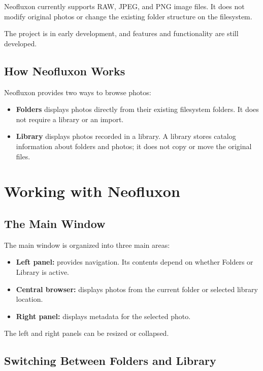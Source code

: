 \documentclass[11pt]{article}
\begin{document}
Neofluxon currently supports RAW, JPEG, and PNG image files. It does not
modify original photos or change the existing folder structure on the
filesystem.

The project is in early development, and features and functionality
are still developed.

\subsection{How Neofluxon Works}

Neofluxon provides two ways to browse photos:
\begin{itemize}
  \item \textbf{Folders} displays photos directly from their existing
        filesystem folders. It does not require a library or an import.
  \item \textbf{Library} displays photos recorded in a library. A
        library stores catalog information about folders and photos; it
        does not copy or move the original files.
\end{itemize}

\section{Working with Neofluxon}

\subsection{The Main Window}

The main window is organized into three main areas:
\begin{itemize}
  \item \textbf{Left panel:} provides navigation. Its contents depend on
        whether Folders or Library is active.
  \item \textbf{Central browser:} displays photos from the current folder or
        selected library location.
  \item \textbf{Right panel:} displays metadata for the selected photo.
\end{itemize}

The left and right panels can be resized or collapsed.

\subsection{Switching Between Folders and Library}
\end{document}
